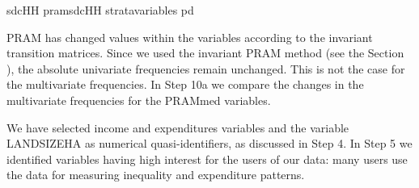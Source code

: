 \documentclass[letterpaper,10pt,english]{sphinxmanual}
\begin{document}
\def\sphinxLiteralBlockLabel{\label{\detokenize{casestudies:code917}}}
%
\begin{sphinxVerbatim}[commandchars=\\\{\},numbers=left,firstnumber=1,stepnumber=1]
sdcHH  pramsdcHH strata\PYGZus{}variables   pd  

\end{sphinxVerbatim}

PRAM has changed values within the variables according to the invariant
transition matrices. Since we used the invariant PRAM method (see
the Section ),
the absolute univariate frequencies remain unchanged.
This is not the case for the multivariate frequencies. In Step 10a we
compare the changes in the multivariate frequencies for the PRAMmed
variables.


We have selected income and expenditures variables and the variable
LANDSIZEHA as numerical quasi-identifiers, as discussed in Step 4. In
Step 5 we identified variables having high interest for the users of our
data: many users use the data for measuring inequality and expenditure
patterns.
\end{document}

